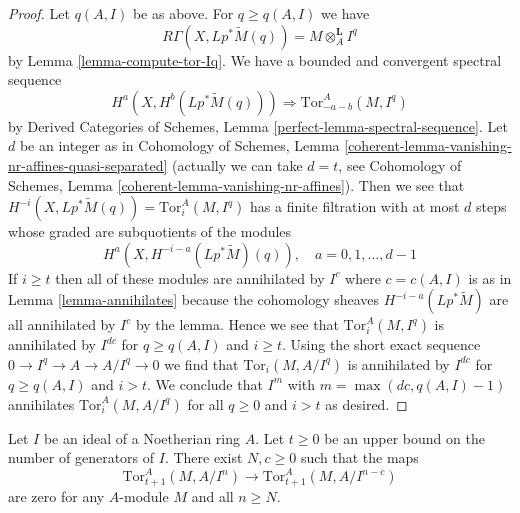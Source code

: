 \begin{proof}
Let $q(A, I)$ be as above. For $q \geq q(A, I)$ we have
$$
R\Gamma(X, Lp^*\widetilde{M}(q)) = M \otimes_A^\mathbf{L} I^q
$$
by Lemma \ref{lemma-compute-tor-Iq}.
We have a bounded and convergent spectral sequence
$$
H^a(X, H^b(Lp^*\widetilde{M}(q))) \Rightarrow
\text{Tor}_{-a - b}^A(M, I^q)
$$
by Derived Categories of Schemes, Lemma \ref{perfect-lemma-spectral-sequence}.
Let $d$ be an integer as in Cohomology of Schemes, Lemma
\ref{coherent-lemma-vanishing-nr-affines-quasi-separated}
(actually we can take $d = t$, see
Cohomology of Schemes, Lemma \ref{coherent-lemma-vanishing-nr-affines}).
Then we see that $H^{-i}(X, Lp^*\widetilde{M}(q)) = \text{Tor}_i^A(M, I^q)$
has a finite filtration with at most $d$ steps whose graded are
subquotients of the modules
$$
H^a(X, H^{- i - a}(Lp^*\widetilde{M})(q)),\quad
a = 0, 1, \ldots, d - 1
$$
If $i \geq t$ then all of these modules are annihilated
by $I^c$ where $c = c(A, I)$ is as in Lemma \ref{lemma-annihilates}
because the cohomology sheaves $H^{- i - a}(Lp^*\widetilde{M})$
are all annihilated by $I^c$ by the lemma. Hence we see that
$\text{Tor}_i^A(M, I^q)$ is annihilated by $I^{dc}$ for
$q \geq q(A, I)$ and $i \geq t$. Using the short exact sequence
$0 \to I^q \to A \to A/I^q \to 0$ we find that
$\text{Tor}_i(M, A/I^q)$ is annihilated by $I^{dc}$ for $q \geq q(A, I)$
and $i > t$. We conclude that $I^m$ with $m = \max(dc, q(A, I) - 1)$
annihilates $\text{Tor}_i^A(M, A/I^q)$ for all $q \geq 0$
and $i > t$ as desired.
\end{proof}

\begin{lemma}
\label{lemma-tor-maps-vanish}
Let $I$ be an ideal of a Noetherian ring $A$. Let $t \geq 0$
be an upper bound on the number of generators of $I$.
There exist $N, c \geq 0$ such that the maps
$$
\text{Tor}_{t + 1}^A(M, A/I^n) \to \text{Tor}_{t + 1}^A(M, A/I^{n - c})
$$
are zero for any $A$-module $M$ and all $n \geq N$.
\end{lemma}

